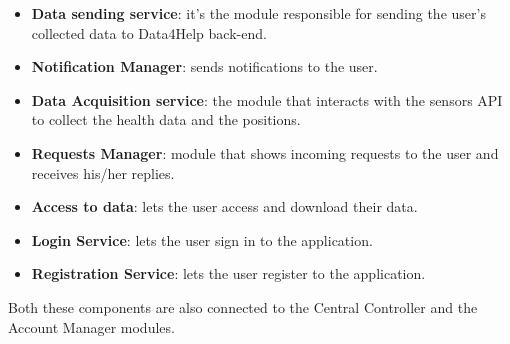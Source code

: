 \begin{itemize}
    \item \textbf{Data sending service}: it's the module responsible for sending the user's collected data to Data4Help back-end.
    \item \textbf{Notification Manager}: sends notifications to the user.
    \item \textbf{Data Acquisition service}: the module that interacts with the sensors API to collect the health data and the positions.
    \item \textbf{Requests Manager}: module that shows incoming requests to the user and receives his/her replies.  
    \item \textbf{Access to data}: lets the user access and download their data.
    \item \textbf{Login Service}: lets the user sign in to the application.
    \item \textbf{Registration Service}: lets the user register to the application.
\end{itemize}
Both these components are also connected to the Central Controller and the Account Manager modules.

\clearpage

